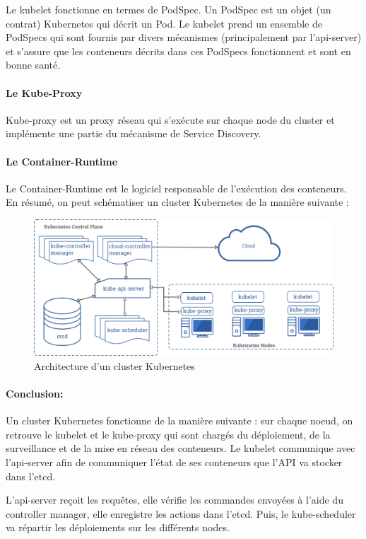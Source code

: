 \documentclass[11pt,fleqn]{book} %
\begin{document}
Le kubelet fonctionne en termes de PodSpec. Un PodSpec est un objet (un contrat) Kubernetes qui décrit un Pod. Le kubelet prend un ensemble de PodSpecs qui sont fournis par divers mécanismes (principalement par l'api-server) et s'assure que les conteneurs décrits dans ces PodSpecs fonctionnent et sont en bonne santé.

\paragraph*{Le Kube-Proxy}
Kube-proxy est un proxy réseau qui s’exécute sur chaque node du cluster et implémente une partie du mécanisme de Service Discovery.

\paragraph*{Le Container-Runtime}
Le Container-Runtime est le logiciel responsable de l’exécution des conteneurs.\\


En résumé, on peut schématiser un cluster Kubernetes de la manière suivante :

\begin{figure}[H]\centering
\renewcommand{\figurename}{Schéma}
\includegraphics[scale=0.1]{Pictures/Comparaison/Kubernetes-cluster-archi.png}
\captionsetup{margin=1.5cm,format=hang,justification=justified}
\caption[]{Architecture d'un cluster Kubernetes \newline}
\end{figure}



\begin{interrupt}
\paragraph{Conclusion:}
Un cluster Kubernetes fonctionne de la manière suivante :
sur chaque noeud, on retrouve le kubelet et le kube-proxy qui sont chargés du déploiement, de la surveillance et de la mise en réseau des conteneurs. Le kubelet communique avec l'api-server afin de communiquer l'état de ses conteneurs que l'API va stocker dans l'etcd.\newline

L'api-server reçoit les requêtes, elle vérifie les commandes envoyées à l'aide du controller manager, elle enregistre les actions dans l'etcd. Puis, le kube-scheduler va répartir les déploiements sur les différents nodes.
\end{interrupt}
\end{document}
